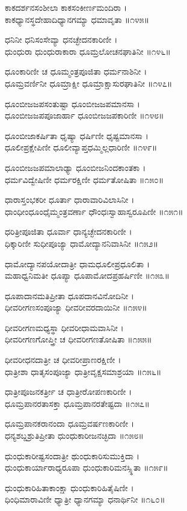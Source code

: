 ಕಾಕದರ್ಶನಸಂಶೀಲಾ ಕಾಕಸಂಕೀರ್ಣಮಂದಿರಾ ।\\
ಕಾಕಧ್ಯಾನಸ್ಥದೇಹಾದಿಧ್ಯಾನಗಮ್ಯಾ ಧಮಾವೃತಾ ॥೧೪೫॥

ಧನಿನೀ ಧನಿಸಂಸೇವ್ಯಾ ಧನಚ್ಛೇದನಕಾರಿಣೀ ।\\
ಧುಂಧುರಾ ಧುಂಧುರಾಕಾರಾ ಧೂಮ್ರಲೋಚನಘಾತಿನೀ ॥೧೪೬॥

ಧೂಂಕಾರಿಣೀ ಚ ಧೂಮ್ಮಂತ್ರಪೂಜಿತಾ ಧರ್ಮನಾಶಿನೀ ।\\
ಧೂಮ್ರವರ್ಣಿನೀ ಧೂಮ್ರಾಕ್ಷೀ ಧೂಮ್ರಾಕ್ಷಾಸುರಘಾತಿನೀ ॥೧೪೭॥

ಧೂಂಬೀಜಜಪಸಂತುಷ್ಟಾ ಧೂಂಬೀಜಜಪಮಾನಸಾ ।\\
ಧೂಂಬೀಜಜಪಪೂಜಾರ್ಹಾ ಧೂಂಬೀಜಜಪಕಾರಿಣೀ ॥೧೪೮॥

ಧೂಂಬೀಜಾಕರ್ಷಿತಾ ಧೃಷ್ಯಾ ಧರ್ಷಿಣೀ ಧೃಷ್ಟಮಾನಸಾ ।\\
ಧೂಲೀಪ್ರಕ್ಷೇಪಿಣೀ ಧೂಲೀವ್ಯಾಪ್ತಧಮ್ಮಿಲ್ಲಧಾರಿಣೀ ॥೧೪೯॥

ಧೂಂಬೀಜಜಪಮಾಲಾಢ್ಯಾ ಧೂಂಬೀಜನಿಂದಕಾಂತಕಾ ।\\
ಧರ್ಮವಿದ್ವೇಷಿಣೀ ಧರ್ಮರಕ್ಷಿಣೀ ಧರ್ಮತೋಷಿತಾ ॥೧೫೦॥

ಧಾರಾಸ್ತಂಭಕರೀ ಧೂರ್ತಾ ಧಾರಾವಾರಿವಿಲಾಸಿನೀ ।\\
ಧಾಂಧೀಂಧೂಂಧೈಮ್ಮಂತ್ರವರ್ಣಾ ಧೌಂಧಃಸ್ವಾಹಾಸ್ವರೂಪಿಣೀ ॥೧೫೧॥

ಧರಿತ್ರೀಪೂಜಿತಾ ಧೂರ್ವಾ ಧಾನ್ಯಚ್ಛೇದನಕಾರಿಣೀ ।\\
ಧಿಕ್ಕಾರಿಣೀ ಸುಧೀಪೂಜ್ಯಾ ಧಾಮೋದ್ಯಾನನಿವಾಸಿನೀ ॥೧೫೨॥

ಧಾಮೋದ್ಯಾನಪಯೋದಾತ್ರೀ ಧಾಮಧೂಲೀಪ್ರಧೂಲಿತಾ ।\\
ಮಹಾಧ್ವನಿಮತೀ ಧೂಪ್ಯಾ ಧೂಪಾಮೋದಪ್ರಹರ್ಷಿಣೀ ॥೧೫೩॥

ಧೂಪಾದಾನಮತಿಪ್ರೀತಾ ಧೂಪದಾನವಿನೋದಿನೀ ।\\
ಧೀವರೀಗಣಸಂಪೂಜ್ಯಾ ಧೀವರೀವರದಾಯಿನೀ ॥೧೫೪॥

ಧೀವರೀಗಣಮಧ್ಯಸ್ಥಾ ಧೀವರೀಧಾಮವಾಸಿನೀ ।\\
ಧೀವರೀಗಣಗೋಪ್ತ್ರೀ ಚ ಧೀವರೀಗಣತೋಷಿತಾ ॥೧೫೫॥

ಧೀವರೀಧನದಾತ್ರೀ ಚ ಧೀವರೀಪ್ರಾಣರಕ್ಷಿಣೀ ।\\
ಧಾತ್ರೀಶಾ ಧಾತೃಸಂಪೂಜ್ಯಾ ಧಾತ್ರೀವೃಕ್ಷಸಮಾಶ್ರಯಾ ॥೧೫೬॥

ಧಾತ್ರೀಪೂಜನಕರ್ತ್ರೀ ಚ ಧಾತ್ರೀರೋಪಣಕಾರಿಣೀ ।\\
ಧೂಮ್ರಪಾನರತಾಸಕ್ತಾ ಧೂಮ್ರಪಾನರತೇಷ್ಟದಾ ॥೧೫೭॥

ಧೂಮ್ರಪಾನಕರಾನಂದಾ ಧೂಮ್ರವರ್ಷಣಕಾರಿಣೀ ।\\
ಧನ್ಯಶಬ್ದಶ್ರುತಿಪ್ರೀತಾ ಧುಂಧುಕಾರೀಜನಚ್ಛಿದಾ ॥೧೫೮॥

ಧುಂಧುಕಾರೀಷ್ಟಸಂದಾತ್ರೀ ಥುಂಧುಕಾರಿಸುಮುಕ್ತಿದಾ ।\\
ಧುಂಧುಕಾರ್ಯಾರಾಧ್ಯರೂಪಾ ಧುಂಧುಕಾರಿಮನಸ್ಸ್ಥಿತಾ ॥೧೫೯॥

ಧುಂಧುಕಾರಿಹಿತಾಕಾಂಕ್ಷಾ ಧುಂಧುಕಾರಿಹಿತೈಷಿಣೀ ।\\
ಧಿಂಧಿಮಾರಾವಿಣೀ ಧ್ಯಾತ್ರೀ ಧ್ಯಾನಗಮ್ಯಾ ಧನಾರ್ಥಿನೀ ॥೧೬೦॥

